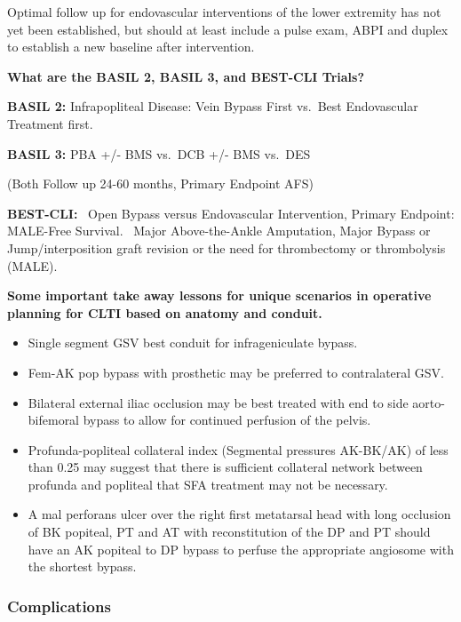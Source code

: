 \documentclass[
]{book}
\begin{document}
Optimal follow up for endovascular interventions of the lower extremity
has not yet been established, but should at least include a pulse exam,
ABPI and duplex to establish a new baseline after intervention.\citep{zierler2018, mohler2012}

\textbf{What are the BASIL 2, BASIL 3, and BEST-CLI Trials?}

\textbf{BASIL 2:} Infrapopliteal Disease: Vein Bypass First vs.~Best Endovascular
Treatment first.

\textbf{BASIL 3:} PBA +/- BMS vs.~DCB +/- BMS vs.~DES

(Both Follow up 24-60 months, Primary Endpoint AFS)

\textbf{BEST-CLI:}~ Open Bypass versus Endovascular Intervention, Primary
Endpoint: MALE-Free Survival.~ Major Above-the-Ankle Amputation,
Major Bypass or Jump/interposition graft revision or the need
for thrombectomy or thrombolysis (MALE).

\textbf{Some important take away lessons for unique scenarios in operative
planning for CLTI based on anatomy and conduit.}

\begin{itemize}
\item
  Single segment GSV best conduit for infrageniculate bypass.
  \citep{arvela2010, avgerinos2015, moreira2016}
\item
  Fem-AK pop bypass with prosthetic may be preferred to contralateral
  GSV. \citep{moreira2016}
\item
  Bilateral external iliac occlusion may be best treated with end to
  side aorto-bifemoral bypass to allow for continued perfusion of the
  pelvis. \citep{jaquinandi2008, vandenakker1992, brewster1978}
\item
  Profunda-popliteal collateral index (Segmental pressures AK-BK/AK)
  of less than 0.25 may suggest that there is sufficient collateral
  network between profunda and popliteal that SFA treatment may not be
  necessary. \citep{boren1980, mawatari2000}
\item
  A mal perforans ulcer over the right first metatarsal head with long
  occlusion of BK popiteal, PT and AT with reconstitution of the DP and PT
  should have an AK popiteal to DP bypass to perfuse the appropriate
  angiosome with the shortest bypass.\citep{hingorani2016, jongsma2017}
\end{itemize}

\hypertarget{complications-1}{%
\subsubsection{Complications}\label{complications-1}}
\end{document}
